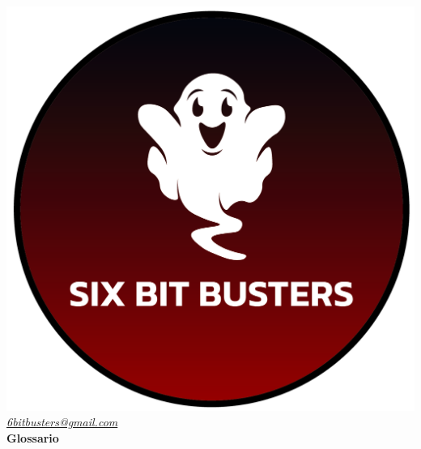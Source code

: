 \thispagestyle{empty}
\renewcommand{\arraystretch}{1.3}


\begin{titlepage}
	\begin{center}
		
	\includegraphics[scale = 0.6]{template/images/logo-circle.png}
	\\[0.8cm]
	\href{mailto:6bitbusters@gmail.com}		      	
	{\large{\textit{6bitbusters@gmail.com} } }\\[0.8cm]
	
	\Huge \textbf{Glossario} \\[0.5cm]


\end{center}
\end{titlepage}
